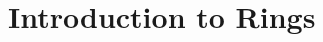 \documentclass[9pt]{book}
\begin{document}
\begin{comment}
      \section{Homomorphisms And Isomorphisms}
         
      \section{Group Actions}
         
         
   \chapter{Subgroups}
      \section{Definition And Examples}
         
      \section{Centralizers And Normalizers, Stabilizes And Kernels}
         
      \section{Cyclic Groups And Cyclic Subgroups}
         
      \section{Subgroups Generated By Subsets Of A Group}
         
      \section{The Lattice Of Subgroups Of A Subgroup}
         
\end{comment}
      \section{Introduction to Rings}
         
\end{document}
